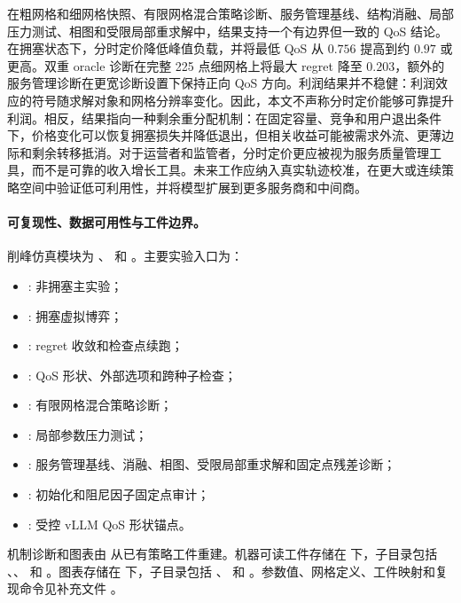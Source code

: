 \documentclass[UTF8,11pt,a4paper]{ctexart}
\begin{document}
在粗网格和细网格快照、有限网格混合策略诊断、服务管理基线、结构消融、局部压力测试、相图和受限局部重求解中，结果支持一个有边界但一致的 QoS 结论。在拥塞状态下，分时定价降低峰值负载，并将最低 QoS 从 $0.756$ 提高到约 $0.97$ 或更高。双重 oracle 诊断在完整 225 点细网格上将最大 regret 降至 $0.203$，额外的服务管理诊断在更宽诊断设置下保持正向 QoS 方向。利润结果并不稳健：利润效应的符号随求解对象和网格分辨率变化。因此，本文不声称分时定价能够可靠提升利润。相反，结果指向一种剩余重分配机制：在固定容量、竞争和用户退出条件下，价格变化可以恢复拥塞损失并降低退出，但相关收益可能被需求外流、更薄边际和剩余转移抵消。对于运营者和监管者，分时定价更应被视为服务质量管理工具，而不是可靠的收入增长工具。未来工作应纳入真实轨迹校准，在更大或连续策略空间中验证低可利用性，并将模型扩展到更多服务商和中间商。

\paragraph{可复现性、数据可用性与工件边界。}

削峰仿真模块为 、
 和
。主要实验入口为：
\begin{itemize}[leftmargin=2em]
  \item {}: 非拥塞主实验；
  \item {}: 拥塞虚拟博弈；
  \item {}: regret 收敛和检查点续跑；
  \item {}: QoS 形状、外部选项和跨种子检查；
  \item {}: 有限网格混合策略诊断；
  \item {}: 局部参数压力测试；
  \item {}: 服务管理基线、消融、相图、受限局部重求解和固定点残差诊断；
  \item {}: 初始化和阻尼因子固定点审计；
  \item {}: 受控 vLLM QoS 形状锚点。
\end{itemize}
机制诊断和图表由  从已有策略工件重建。机器可读工件存储在  下，子目录包括 、、 和 。图表存储在  下，子目录包括 、 和 。参数值、网格定义、工件映射和复现命令见补充文件
。
\end{document}

